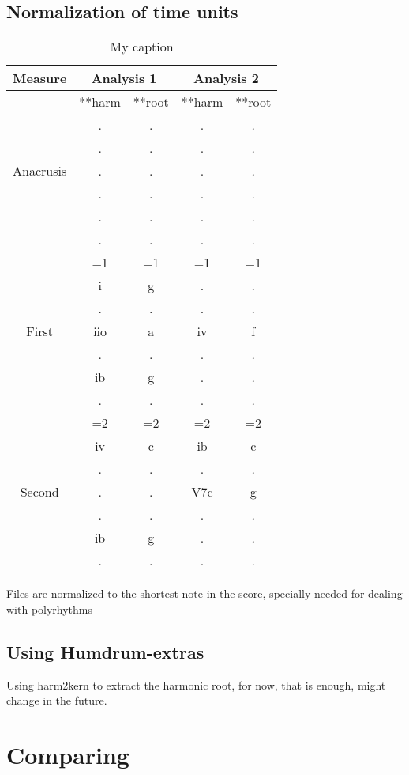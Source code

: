   \subsection{Normalization of time units}
	\begin{table}[]
	\centering
	\begin{tabular}{|c|cc|cc|}
	\hline
	Measure & \multicolumn{2}{c|}{Analysis 1} & \multicolumn{2}{c|}{Analysis 2} \\ \hline
	\multirow{7}{*}{Anacrusis} & **harm & **root & **harm & **root \\
	 & . & . & . & . \\
	 & . & . & . & . \\
	 & . & . & . & . \\
	 & . & . & . & . \\
	 & . & . & . & . \\
	 & . & . & . & . \\ \hline
	\multirow{7}{*}{First} & =1 & =1 & =1 & =1 \\
	 & i & g & . & . \\
	 & . & . & . & . \\
	 & iio & a & iv & f \\
	 & . & . & . & . \\
	 & ib & g & . & . \\
	 & . & . & . & . \\ \hline
	\multirow{7}{*}{Second} & =2 & =2 & =2 & =2 \\
	 & iv & c & ib & c \\
	 & . & . & . & . \\
	 & . & . & V7c & g \\
	 & . & . & . & . \\
	 & ib & g & . & . \\
	 & . & . & . & . \\ \hline
	\end{tabular}
	\caption{My caption}
	\label{my-label}
	\end{table}
  Files are normalized to the shortest note in the score, specially needed for dealing with polyrhythms
	\subsection{Using Humdrum-extras}
  Using harm2kern to extract the harmonic root, for now, that is enough, might change in the future.
\section{Comparing}
